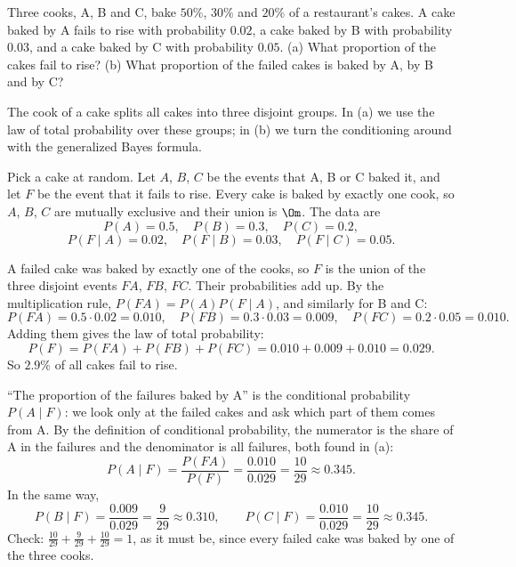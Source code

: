 
\begin{problem}
	Three cooks, A, B and C, bake $50\%$, $30\%$ and $20\%$ of a restaurant's
	cakes. A cake baked by A fails to rise with probability $0.02$, a cake baked
	by B with probability $0.03$, and a cake baked by C with probability $0.05$.
	(a) What proportion of the cakes fail to rise?
	(b) What proportion of the failed cakes is baked by A, by B and by C?
\end{problem}

\begin{solution}
	\idea The cook of a cake splits all cakes into three disjoint groups. In (a)
	we use the law of total probability over these groups; in (b) we turn the
	conditioning around with the generalized Bayes formula.

	Pick a cake at random. Let $A$, $B$, $C$ be the events that A, B or C baked
	it, and let $F$ be the event that it fails to rise. Every cake is baked by
	exactly one cook, so $A$, $B$, $C$ are mutually exclusive and their union is
	$\Om$. The data are
	\[ P(A)=0.5,\quad P(B)=0.3,\quad P(C)=0.2, \]
	\[ P(F\mid A)=0.02,\quad P(F\mid B)=0.03,\quad P(F\mid C)=0.05. \]

	 A failed cake was baked by exactly one of the cooks, so $F$ is
	the union of the three disjoint events $FA$, $FB$, $FC$. Their
	probabilities add up. By the multiplication rule, $P(FA)=P(A)P(F\mid A)$,
	and similarly for B and C:
	\[ P(FA)=0.5\cdot0.02=0.010,\quad P(FB)=0.3\cdot0.03=0.009,\quad
		P(FC)=0.2\cdot0.05=0.010. \]
	Adding them gives the law of total probability:
	\[ P(F)=P(FA)+P(FB)+P(FC)=0.010+0.009+0.010=0.029. \]
	So $2.9\%$ of all cakes fail to rise.

	 ``The proportion of the failures baked by A'' is the conditional
	probability $P(A\mid F)$: we look only at the failed cakes and ask which
	part of them comes from A. By the definition of conditional probability,
	the numerator is the share of A in the failures and the denominator is all
	failures, both found in (a):
	\[ P(A\mid F)=\frac{P(FA)}{P(F)}=\frac{0.010}{0.029}=\frac{10}{29}\approx0.345. \]
	In the same way,
	\[ P(B\mid F)=\frac{0.009}{0.029}=\frac{9}{29}\approx0.310,\qquad
		P(C\mid F)=\frac{0.010}{0.029}=\frac{10}{29}\approx0.345. \]
	Check: $\frac{10}{29}+\frac{9}{29}+\frac{10}{29}=1$, as it must be, since
	every failed cake was baked by one of the three cooks.


\end{solution}
